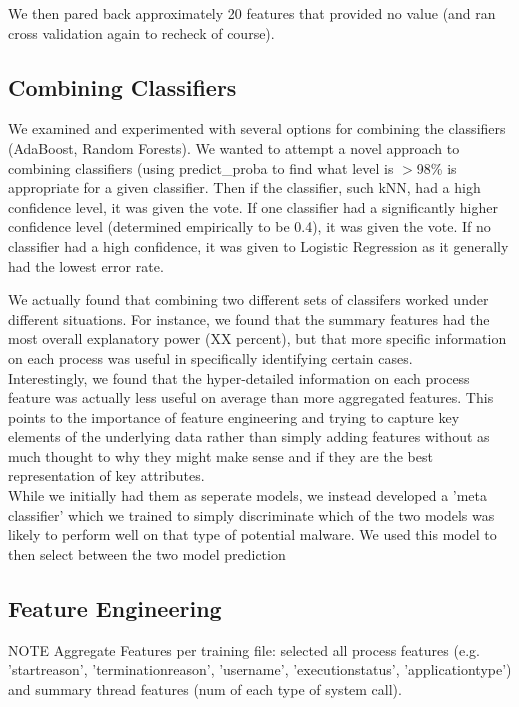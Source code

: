 \documentclass[11pt, oneside]{article}   	%
\begin{document}
We then pared back approximately 20 features that provided no value (and ran cross validation again to recheck of course).

\subsection*{Combining Classifiers}

We examined and experimented with several options for combining the classifiers (AdaBoost, Random Forests). We wanted to attempt a novel approach to combining classifiers (using predict\_proba to find what level is $>$98\% is appropriate for a given classifier. Then if the classifier, such kNN, had a high confidence level, it was given the vote. If one classifier had a significantly higher confidence level (determined empirically to be 0.4), it was given the vote. If no classifier had a high confidence, it was given to Logistic Regression as it generally had the lowest error rate.

We actually found that combining two different sets of classifers worked under different situations. For instance, we found that the summary features had the most overall explanatory power (XX percent), but that more specific information on each process was useful in specifically identifying certain cases.
\
\\
Interestingly, we found that the hyper-detailed information on each process feature was actually less useful on average than more aggregated features. This points to the importance of feature engineering and trying to capture key elements of the underlying data rather than simply adding features without as much thought to why they might make sense and if they are the best representation of key attributes.
\
\\
While we initially had them as seperate models, we instead developed a 'meta classifier' which we trained to simply discriminate which of the two models was likely to perform well on that type of potential malware. We used this model to then select between the two model prediction



\subsection*{Feature Engineering}

NOTE
Aggregate Features per training file:
 selected all process features  (e.g. 'startreason', 'terminationreason', 'username', 'executionstatus', 'applicationtype') and summary thread features (num of each type of system call).
\end{document}
